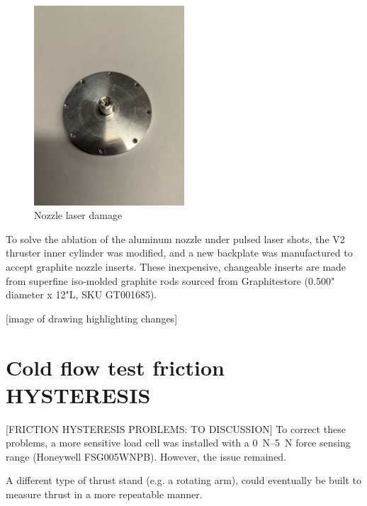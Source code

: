                 \begin{figure}[!ht]
                    \centering
                    \includegraphics[width=0.5\textwidth]{assets/4 experiments/Nozzle damage.jpg}
                    \caption{Nozzle laser damage}
                \end{figure}
            
                To solve the ablation of the aluminum nozzle under pulsed laser shots, the V2 thruster inner cylinder was modified, and a new backplate was manufactured to accept graphite nozzle inserts. These inexpensive, changeable inserts are made from superfine iso-molded graphite rods sourced from Graphitestore (0.500" diameter x 12"L, SKU GT001685).
    
                [image of drawing highlighting changes]

    \section{Cold flow test friction HYSTERESIS}

                [FRICTION HYSTERESIS PROBLEMS: TO DISCUSSION] To correct these problems, a more sensitive load cell was installed with a \qtyrange{0}{5}{N} force sensing range (Honeywell FSG005WNPB). However, the issue remained.

            A different type of thrust stand (e.g. a rotating arm), could eventually be built to measure thrust in a more repeatable manner.